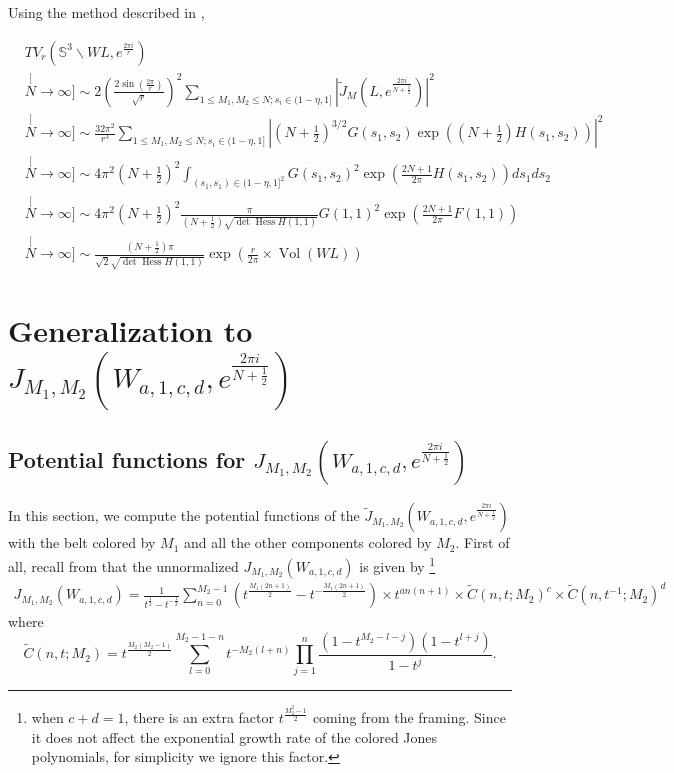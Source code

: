 \documentclass[10pt,a4paper]{article}
\newcommand{\lt}{\left}
\newcommand{\rt}{\right}
\def\Vol{\operatorname{Vol}}
\def\SS{{\mathbb S}}
\def\Vol{\operatorname{Vol}}
\def \det{\operatorname{det}}
\def \Hess{\operatorname{Hess}}
\begin{document}
Using the method described in \cite{WA17},

\begin{align*}
&TV_{r}\left(\SS^3 \backslash WL, e^{\frac{2\pi i}{r}}\right) \\
&\stackrel[N \to \infty]{\sim}{ }  2\lt( \frac{2\sin(\frac{2\pi}{r})}{\sqrt{r}}\rt)^{2} \sum_{1\leq M_1,M_2 \leq N; s_i\in (1-\eta,1]}\left|\tilde{J}_{M}\left(L,e^{\frac{2\pi i }{N+\frac{1}{2}}}\right)\right|^2 \\
&\stackrel[N \to \infty]{\sim}{ }  \frac{32\pi^2}{r^3}  \sum_{1\leq M_1,M_2 \leq N; s_i\in (1-\eta,1]} \lt| (N+\frac{1}{2})^{3/2} G(s_1,s_2) \exp( (N+\frac{1}{2})H(s_1,s_2))  \rt|^2 \\
&\stackrel[N \to \infty]{\sim}{ }  4\pi^2(N+\frac{1}{2})^2 \int_{ (s_1,s_1)\in (1-\eta,1]^2}  G(s_1,s_2)^2 \exp\lt( \frac{2N+1}{2\pi} H(s_1,s_2)  \rt) ds_1ds_2\\
&\stackrel[N \to \infty]{\sim}{ }  4\pi^2(N+\frac{1}{2})^2 \frac{\pi}{(N+\frac{1}{2})\sqrt{\det \Hess H(1,1)}} G(1,1)^2 \exp\lt( \frac{2N+1}{2\pi} F(1,1)  \rt)   \\
&\stackrel[N \to \infty]{\sim}{ }   \frac{(N+\frac{1}{2})\pi}{\sqrt{2}\sqrt{\det \Hess H(1,1)}} \exp\lt(\frac{r}{2\pi}\times\Vol(WL)\rt)
\end{align*}
\fi

\section{Generalization to $J_{M_1,M_2}(W_{a,1,c,d},e^{\frac{2\pi i}{N+\frac{1}{2}}})$}\label{gen}

\subsection{Potential functions for $J_{M_1,M_2}(W_{a,1,c,d},e^{\frac{2\pi i}{N+\frac{1}{2}}})$}
In this section, we compute the potential functions of the $\tilde{J}_{M_1,M_2}(W_{a,1,c,d}, e^{\frac{2\pi i}{N+\frac{1}{2}}})$ with the belt colored by $M_1$ and all the other components colored by $M_2$. First of all, recall from \cite{V08} that the unnormalized $J_{M_1,M_2}(W_{a,1,c,d})$ is given by \footnote{when $c+d=1$, there is an extra factor $t^{\frac{M_2^2-1}{2}}$ coming from the framing. Since it does not affect the exponential growth rate of the colored Jones polynomials, for simplicity we ignore this factor.}
\begin{align*}
J_{M_1,M_2} (W_{a,1,c,d}) = \frac{1}{t^{\frac{1}{2}}-t^{-\frac{1}{2}}} \sum_{n=0}^{M_2-1} (t^{\frac{M_1(2n+1)}{2}}-t^{-\frac{M_1(2n+1)}{2}}) \times t^{an(n+1)} \times \tilde{C}(n,t; M_2)^c \times \tilde{C}(n,t^{-1}; M_2)^d
\end{align*}
where 
$$\tilde{C}(n,t; M_2) =  t^{\frac{M_2(M_2-1)}{2}} \sum_{l = 0}^{M_2-1-n} t^{-M_2(l+n)} \prod_{j=1}^{n} \frac{(1-t^{M_2-l-j})(1-t^{l+j})}{1-t^j}.$$
\end{document}
